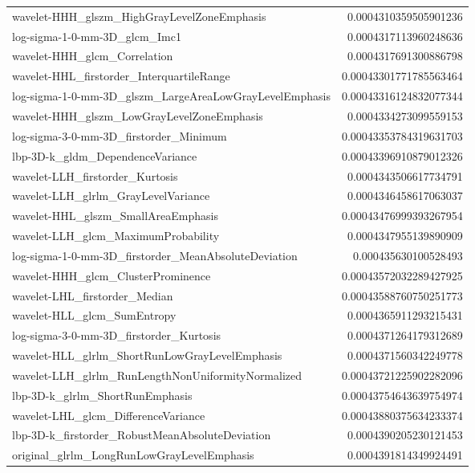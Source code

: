 {\begin{xltabular}[H]{\textwidth}{X r}
        wavelet-HHH\_glszm\_HighGrayLevelZoneEmphasis & 0.0004310359505901236 \\
        log-sigma-1-0-mm-3D\_glcm\_Imc1 & 0.0004317113960248636 \\
        wavelet-HHH\_glcm\_Correlation & 0.0004317691300886798 \\
        wavelet-HHL\_firstorder\_InterquartileRange & 0.00043301771785563464 \\
        log-sigma-1-0-mm-3D\_glszm\_LargeAreaLowGrayLevelEmphasis & 0.00043316124832077344 \\
        wavelet-HHH\_glszm\_LowGrayLevelZoneEmphasis & 0.0004334273099559153 \\
        log-sigma-3-0-mm-3D\_firstorder\_Minimum & 0.00043353784319631703 \\
        lbp-3D-k\_gldm\_DependenceVariance & 0.00043396910879012326 \\
        wavelet-LLH\_firstorder\_Kurtosis & 0.0004343506617734791 \\
        wavelet-LLH\_glrlm\_GrayLevelVariance & 0.0004346458617063037 \\
        wavelet-HHL\_glszm\_SmallAreaEmphasis & 0.00043476999393267954 \\
        wavelet-LLH\_glcm\_MaximumProbability & 0.0004347955139890909 \\
        log-sigma-1-0-mm-3D\_firstorder\_MeanAbsoluteDeviation & 0.000435630100528493 \\
        wavelet-HHH\_glcm\_ClusterProminence & 0.00043572032289427925 \\
        wavelet-LHL\_firstorder\_Median & 0.00043588760750251773 \\
        wavelet-HLL\_glcm\_SumEntropy & 0.0004365911293215431 \\
        log-sigma-3-0-mm-3D\_firstorder\_Kurtosis & 0.0004371264179312689 \\
        wavelet-HLL\_glrlm\_ShortRunLowGrayLevelEmphasis & 0.0004371560342249778 \\
        wavelet-LLH\_glrlm\_RunLengthNonUniformityNormalized & 0.00043721225902282096 \\
        lbp-3D-k\_glrlm\_ShortRunEmphasis & 0.00043754643639754974 \\
        wavelet-LHL\_glcm\_DifferenceVariance & 0.00043880375634233374 \\
        lbp-3D-k\_firstorder\_RobustMeanAbsoluteDeviation & 0.0004390205230121453 \\
        original\_glrlm\_LongRunLowGrayLevelEmphasis & 0.0004391814349924491 \\

\end{xltabular}}
